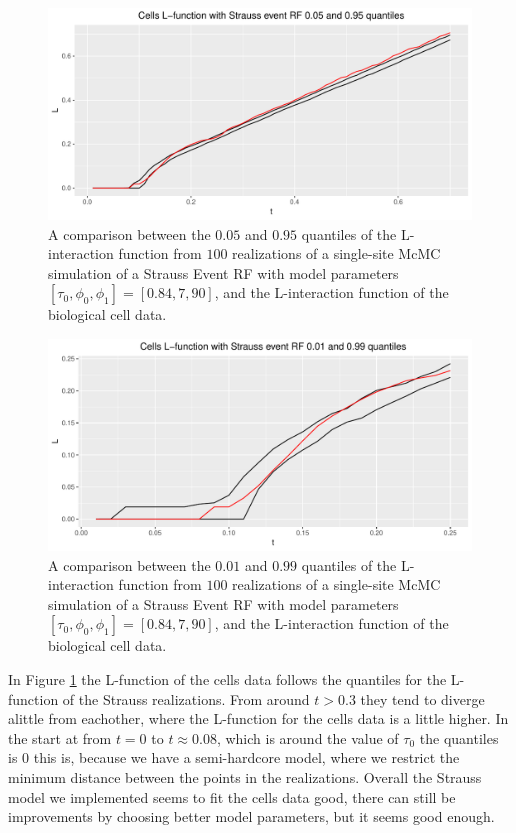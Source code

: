 \begin{figure}
    \centering
    \includegraphics[scale=0.65]{figures/strauss_quant1.pdf}
    \caption{A comparison between the $0.05$ and $0.95$ quantiles of the L-interaction function from $100$ realizations of a single-site McMC simulation of a Strauss Event RF with model parameters $[\tau_0,\phi_0,\phi_1] = [0.84,7,90]$, and the L-interaction function of the biological cell data.}
    \label{fig:strauss_quant1}
\end{figure}

\begin{figure}
    \centering
    \includegraphics[scale=0.65]{figures/strauss_quant2.pdf}
    \caption{A comparison between the $0.01$ and $0.99$ quantiles of the L-interaction function from $100$ realizations of a single-site McMC simulation of a Strauss Event RF with model parameters $[\tau_0,\phi_0,\phi_1] = [0.84,7,90]$, and the L-interaction function of the biological cell data.}
    \label{fig:strauss_quant2}
\end{figure}

In Figure \ref{fig:strauss_quant1} the L-function of the cells data follows the quantiles for the L-function of the Strauss realizations. From around $t>0.3$ they tend to diverge alittle from eachother, where the L-function for the cells data is a little higher. In the start at from $t=0$ to $t\approx 0.08$, which is around the value of $\tau_0$ the quantiles is $0$ this is, because we have a semi-hardcore model, where we restrict the minimum distance between the points in the realizations. Overall the Strauss model we implemented seems to fit the cells data good, there can still be improvements by choosing better model parameters, but it seems good enough. 